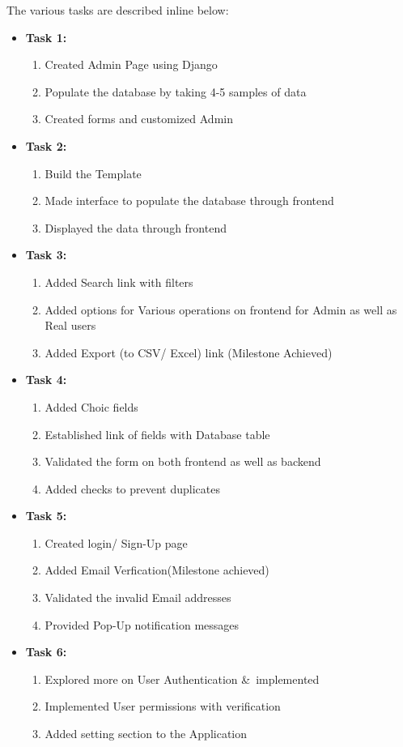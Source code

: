 \documentclass[12pt]{report}
\begin{document}
The various tasks are described inline below:
 \begin{itemize}
\item \textbf{Task 1:} \\
\begin{enumerate}
\item Created Admin Page using Django
\item Populate the database by taking 4-5 samples of data
\item Created forms and customized Admin
\end{enumerate}  \newpage
\item \textbf{Task 2:\\}
\begin{enumerate}
\item Build the Template
\item Made interface to populate the database through frontend
\item Displayed the data through frontend
\end{enumerate}
\item \textbf{Task 3:}
\begin{enumerate}
\item Added Search link with filters
\item Added options for Various operations on frontend for Admin as well as Real users
\item Added Export (to CSV/ Excel) link (Milestone Achieved)
\end{enumerate}
\item \textbf{Task 4:}
\begin{enumerate}
\item Added Choic fields
\item Established link of fields with Database table 
\item Validated the form on both frontend as well as backend
\item Added checks to prevent duplicates
\end{enumerate}

\item \textbf{Task 5:}
\begin{enumerate}
\item Created login/ Sign-Up page
\item Added Email Verfication(Milestone achieved) 
\item Validated the invalid Email addresses
\item Provided Pop-Up notification messages
\end{enumerate}
\item \textbf{Task 6:}
\begin{enumerate}
\item Explored more on User Authentication \&\ implemented
\item Implemented User permissions with verification
\item Added setting section to the Application


\end{enumerate}
\end{itemize}
\end{document}
